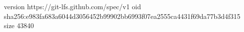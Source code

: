 version https://git-lfs.github.com/spec/v1
oid sha256:e983fa683a6044d3056452b99902bb6993f07ea2555ca4431f69da77b3d4f315
size 43840

